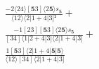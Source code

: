 \documentclass[varwidth, border=5pt]{standalone}
\begin{document}
\begin{my}
$\begin{gathered}
\scriptscriptstyle\frac{-2⟨24⟩[𝟓3]⟨2𝟓⟩s_{𝟓}}{⟨12⟩⟨2|1+4|3]²} +\\
\scriptscriptstyle\frac{-1[23][𝟓3]⟨2𝟓⟩s_{𝟓}}{[34]⟨1|2+4|3]⟨2|1+4|3]} +\\
\scriptscriptstyle\frac{1[𝟓3]⟨2|1+4|𝟓|𝟓⟩}{⟨12⟩[34]⟨2|1+4|3]} \phantom{+}
\end{gathered}$
\end{my}
\end{document}
